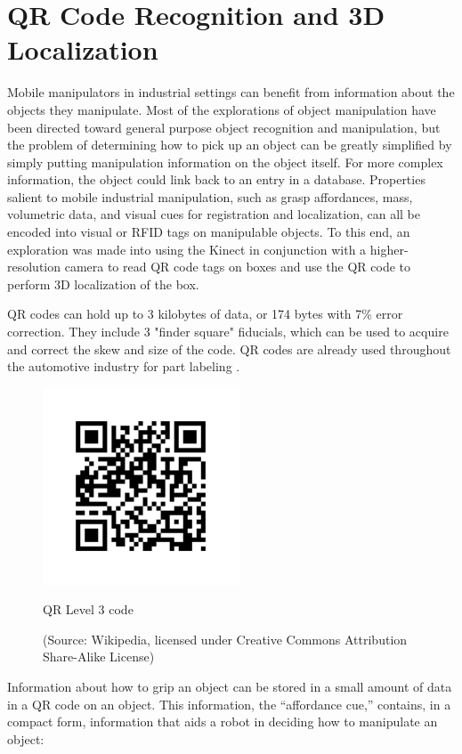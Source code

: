 \documentclass[]{cwru} %
\begin{document}
\section{QR Code Recognition and 3D Localization}

Mobile manipulators in industrial settings can benefit from information
about the objects they manipulate. Most of the explorations of object
manipulation have been directed toward general purpose object
recognition and manipulation, but the problem of determining how to pick
up an object can be greatly simplified by simply putting manipulation
information on the object itself. For more complex information, the
object could link back to an entry in a database. Properties salient to
mobile industrial manipulation, such as grasp affordances, mass,
volumetric data, and visual cues for registration and localization, can
all be encoded into visual or RFID tags on manipulable objects. To this
end, an exploration was made into using the Kinect in conjunction with a
higher-resolution camera to read QR code tags on boxes and use the QR
code to perform 3D localization of the box.

QR codes can hold up to 3 kilobytes of data, or 174 bytes with 7\% error
correction. They include 3 "finder square" fiducials, which can be used
to acquire and correct the skew and size of the code. QR codes are
already used throughout the automotive industry for part
labeling \cite{qr}.

\begin{figure}[ht]
\centering
\includegraphics[width=2.3in]{Qr-3}
\caption{QR Level 3 code}
\caption*{(Source: Wikipedia, licensed under Creative Commons Attribution 
Share-Alike License)}
\label{fig:qr}

\end{figure}

Information about how to grip an object can be stored in a small amount
of data in a QR code on an object. This information, the ``affordance
cue,'' contains, in a compact form, information that aids a robot in
deciding how to manipulate an object:
\end{document}
